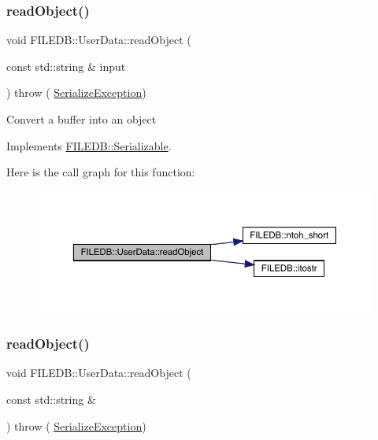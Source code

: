 \subsubsection{\texorpdfstring{readObject()}{readObject()}\hspace{0.1cm}{\footnotesize\ttfamily [2/3]}}
{\footnotesize\ttfamily void F\+I\+L\+E\+D\+B\+::\+User\+Data\+::read\+Object (\begin{DoxyParamCaption}\item[{const std\+::string \&}]{input }\end{DoxyParamCaption}) throw ( \mbox{\hyperlink{classFILEDB_1_1SerializeException}{Serialize\+Exception}}) \hspace{0.3cm}{\ttfamily [virtual]}}

Convert a buffer into an object 

Implements \mbox{\hyperlink{classFILEDB_1_1Serializable_a21a5831fa4f65790490a8a5eba9fcab2}{F\+I\+L\+E\+D\+B\+::\+Serializable}}.

Here is the call graph for this function\+:
\nopagebreak
\begin{figure}[H]
\begin{center}
\leavevmode
\includegraphics[width=350pt]{dc/d12/classFILEDB_1_1UserData_a61ccded861bac4b772af2488a2cc7605_cgraph}
\end{center}
\end{figure}
\mbox{\label{classFILEDB_1_1UserData_a61ccded861bac4b772af2488a2cc7605}} 
\subsubsection{\texorpdfstring{readObject()}{readObject()}\hspace{0.1cm}{\footnotesize\ttfamily [3/3]}}
{\footnotesize\ttfamily void F\+I\+L\+E\+D\+B\+::\+User\+Data\+::read\+Object (\begin{DoxyParamCaption}\item[{const std\+::string \&}]{ }\end{DoxyParamCaption}) throw ( \mbox{\hyperlink{classFILEDB_1_1SerializeException}{Serialize\+Exception}}) \hspace{0.3cm}{\ttfamily [virtual]}}

